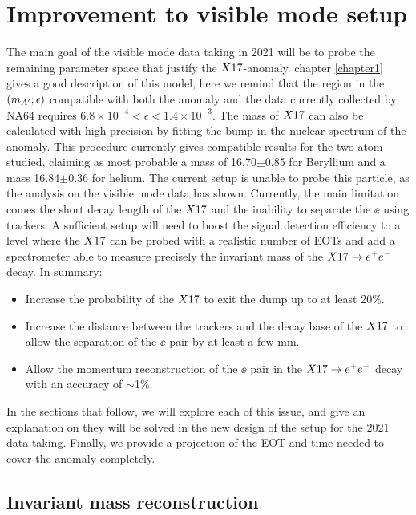 \section{Improvement to visible mode setup}
\label{ch5:sec:new-vismode-setup}

The main goal of the visible mode data taking in 2021 will be to probe the remaining parameter space that justify the $X17$-anomaly. chapter \ref{chapter1} gives a good description of this model, here we remind that the region in the $(m_{A'};\epsilon)$ compatible with both the anomaly and the data currently collected by NA64 requires $6.8 \times 10^{-4} < \epsilon < 1.4 \times 10^{-3}$. The mass of $X17$ can also be calculated with high precision by fitting the bump in the nuclear spectrum of the anomaly. This procedure currently gives compatible results for the two atom studied, claiming as most probable a mass of 16.70$\pm$0.85 \mev for Beryllium and a mass 16.84$\pm$0.36 \mev for helium. The current setup is unable to probe this particle, as the analysis on the visible mode data has shown. Currently, the main limitation comes the short decay length of the $X17$ and the inability to separate the $\ee$ using trackers. A sufficient setup will need to boost the signal detection efficiency to a level where the $X17$ can be probed with a realistic number of EOTs and add a spectrometer able to measure precisely the invariant mass of the $X17 \rightarrow e^+ e^-$ decay. In summary:

\begin{itemize}
\item Increase the probability of the $X17$ to exit the dump up to at least 20\%.
\item Increase the distance between the trackers and the decay base of the $X17$ to allow the separation of the $\ee$ pair by at least a few mm.
\item Allow the momentum reconstruction of the $\ee$ pair in the $X17 \rightarrow e^+ e^-$ decay with an accuracy of $\sim$1\%.
\end{itemize}

In the sections that follow, we will explore each of this issue, and give an explanation on they will be solved in the new design of the setup for the 2021 data taking.  Finally, we provide a projection of the EOT and time needed to cover the anomaly completely.

\subsection{Invariant mass reconstruction}
\label{ch5:sec:new-vismode-setup-invmass}

